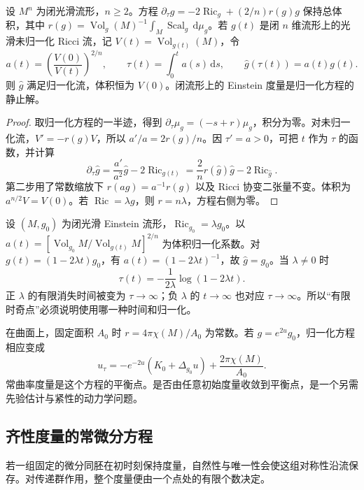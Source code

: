 \begin{proposition}\label{g3:prop:ricci-flow-normalization}
	设 \(M^n\) 为闭光滑流形，\(n\ge2\)。方程 \(\partial_\tau g=-2\operatorname{Ric}_g+(2/n)r(g)g\) 保持总体积，其中 \(r(g)=\operatorname{Vol}_g(M)^{-1}\int_M\operatorname{Scal}_g\,\mathrm d\mu_g\)。若 \(g(t)\) 是闭 \(n\) 维流形上的光滑未归一化 Ricci 流，记 \(V(t)=\operatorname{Vol}_{g(t)}(M)\)，令
	\begin{equation}\label{g3:eq:ricci-flow-normalizing-change}
		a(t)=\left(\frac{V(0)}{V(t)}\right)^{2/n},\qquad
		\tau(t)=\int_0^t a(s)\,\mathrm ds,\qquad
		\widehat g(\tau(t))=a(t)g(t).
	\end{equation}
	则 \(\widehat g\) 满足归一化流，体积恒为 \(V(0)\)。闭流形上的 Einstein 度量是归一化方程的静止解。
\end{proposition}
\begin{proof}
	取归一化方程的一半迹，得到 \(\partial_\tau\mu_g=(-s+r)\mu_g\)，积分为零。对未归一化流，\(V'=-r(g)V\)，所以 \(a'/a=2r(g)/n\)。因 \(\tau'=a>0\)，可把 \(t\) 作为 \(\tau\) 的函数，并计算
	\[
		\partial_\tau\widehat g
		=\frac{a'}{a^2}\widehat g-2\operatorname{Ric}_{g(t)}
		=\frac2n r(\widehat g)\widehat g-2\operatorname{Ric}_{\widehat g}.
	\]
	第二步用了常数缩放下 \(r(ag)=a^{-1}r(g)\) 以及 Ricci 协变二张量不变。体积为 \(a^{n/2}V=V(0)\)。若 \(\operatorname{Ric}=\lambda g\)，则 \(r=n\lambda\)，方程右侧为零。
\end{proof}

\begin{example}\label{g3:exm:ricci-normalized-time}
	设 \((M,g_0)\) 为闭光滑 Einstein 流形，\(\operatorname{Ric}_{g_0}=\lambda g_0\)。以 \(a(t)=[\operatorname{Vol}_{g_0}M/\operatorname{Vol}_{g(t)}M]^{2/n}\) 为体积归一化系数。对 \(g(t)=(1-2\lambda t)g_0\)，有 \(a(t)=(1-2\lambda t)^{-1}\)，故 \(\widehat g=g_0\)。当 \(\lambda\ne0\) 时
	\[
		\tau(t)=-\frac{1}{2\lambda}\log(1-2\lambda t).
	\]
	正 \(\lambda\) 的有限消失时间被变为 \(\tau\to\infty\)；负 \(\lambda\) 的 \(t\to\infty\) 也对应 \(\tau\to\infty\)。所以“有限时奇点”必须说明使用哪一种时间和归一化。
\end{example}

在曲面上，固定面积 \(A_0\) 时 \(r=4\pi\chi(M)/A_0\) 为常数。若 \(g=e^{2u}g_0\)，归一化方程相应变成
\[
	 u_\tau=-e^{-2u}(K_0+\Delta_{g_0}u)+\frac{2\pi\chi(M)}{A_0}.
\]
常曲率度量是这个方程的平衡点。是否由任意初始度量收敛到平衡点，是一个另需先验估计与紧性的动力学问题。

\subsection{齐性度量的常微分方程}
\label{g3:subsec:2705:03}
若一组固定的微分同胚在初时刻保持度量，自然性与唯一性会使这组对称性沿流保存。对传递群作用，整个度量便由一个点处的有限个数决定。

